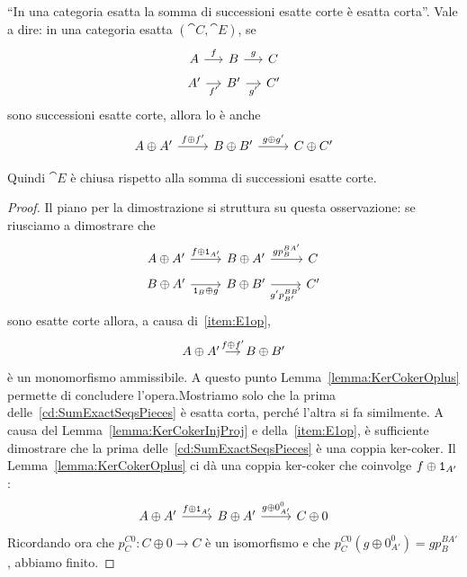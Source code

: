 \begin{proposition}\label{proposition:SumExactSeqsIsExact}
  ``In una categoria esatta la somma di successioni esatte corte è
  esatta corta''. Vale a dire: in una categoria esatta
  \((\cat C,\cat E)\), se
  \[
    \begin{tikzcd}[row sep=tiny, column sep=small]
      A \ar["{f}", r] & B \ar["{g}", r] & C \\
      A' \ar["{f'}", r, swap] & B' \ar["{g'}", r, swap] & C'
    \end{tikzcd}
  \]
  sono successioni esatte corte, allora lo è anche
  \begin{equation}
    \label{cd:SumExactSeqs}
    \begin{tikzcd}[row sep=small]
      A \oplus A' \ar["{f \oplus f'}", r] & B \oplus B' \ar["{g \oplus
        g'}", r] & C \oplus C'
    \end{tikzcd}
  \end{equation}
\end{proposition}

Quindi \(\cat E\) è chiusa rispetto alla somma di successioni esatte
corte.

\begin{proof}
  Il piano per la dimostrazione si struttura su questa osservazione: se
  riusciamo a dimostrare che
  \begin{equation}
    \begin{tikzcd}[row sep=tiny]
      A \oplus A' \ar["{f \oplus \id_{A'}}", r] & B \oplus A' \ar["{g
        p_{B}^{BA'}}",
      r] & C \\
      B \oplus A' \ar["{\id_B \oplus g}", r, swap] & B \oplus B'
      \ar["{g' p_{B'}^{BB'}}", r, swap] & C'
    \end{tikzcd}
    \label{cd:SumExactSeqsPieces}
  \end{equation}
  sono esatte corte allora, a causa di~\ref{item:E1op},
  \[
    \begin{tikzcd}[column sep=small, row sep=tiny]
      A \oplus A' \ar["{f \oplus f'}", r] & B \oplus B'
    \end{tikzcd}
  \]
  è un monomorfismo ammissibile.  A questo punto
  Lemma~\ref{lemma:KerCokerOplus} permette di concludere
  l'opera.\newline Mostriamo solo che la prima
  delle~\eqref{cd:SumExactSeqsPieces} è esatta corta, perché l'altra si
  fa similmente. A causa del Lemma~\ref{lemma:KerCokerInjProj} e
  della~\ref{item:E1op}, è sufficiente dimostrare che la prima
  delle~\ref{cd:SumExactSeqsPieces} è una coppia ker-coker. Il
  Lemma~\ref{lemma:KerCokerOplus} ci dà una coppia ker-coker che
  coinvolge \(f \oplus \mathtt 1_{A'}\):
  \[
    \begin{tikzcd}
      A \oplus A' \ar["{f \oplus \id_{A'}}", r] & B \oplus A' \ar["{g
        \oplus 0_{A'}^0}", r] & C \oplus 0
    \end{tikzcd}
  \]
  Ricordando ora che \(p_{C}^{C0} : C \oplus 0 \to C\) è un isomorfismo
  e che \(p_{C}^{C0} \left( g \oplus 0_{A'}^0 \right) = g p_{B}^{BA'}\),
  abbiamo finito.
\end{proof}


